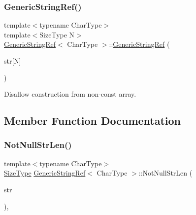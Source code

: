 \subsubsection{\texorpdfstring{Generic\+String\+Ref()}{GenericStringRef()}\hspace{0.1cm}{\footnotesize\ttfamily [5/5]}}
{\footnotesize\ttfamily template$<$typename Char\+Type$>$ \\
template$<$Size\+Type N$>$ \\
\hyperlink{structGenericStringRef}{Generic\+String\+Ref}$<$ Char\+Type $>$\+::\hyperlink{structGenericStringRef}{Generic\+String\+Ref} (\begin{DoxyParamCaption}\item[{Char\+Type(\&)}]{str\mbox{[}\+N\mbox{]} }\end{DoxyParamCaption})\hspace{0.3cm}{\ttfamily [private]}}



Disallow construction from non-\/const array. 



\subsection{Member Function Documentation}
\mbox{\label{structGenericStringRef_af51482556048c13920f5564a48e8ad7d}} 
\subsubsection{\texorpdfstring{Not\+Null\+Str\+Len()}{NotNullStrLen()}}
{\footnotesize\ttfamily template$<$typename Char\+Type$>$ \\
\hyperlink{rapidjson_8h_a5ed6e6e67250fadbd041127e6386dcb5}{Size\+Type} \hyperlink{structGenericStringRef}{Generic\+String\+Ref}$<$ Char\+Type $>$\+::Not\+Null\+Str\+Len (\begin{DoxyParamCaption}\item[{const Char\+Type $\ast$}]{str }\end{DoxyParamCaption})\hspace{0.3cm}{\ttfamily [inline]}, {\ttfamily [private]}}

\mbox{\label{structGenericStringRef_a4e652ee3a398d0eb8ece1835d15274d0}} 
